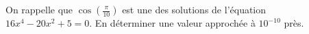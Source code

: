 \question{}  On rappelle que $\cos\left(\frac{\pi}{10}\right)$ est une des solutions de l'équation $16x^4-20x^2+5 = 0$. En déterminer une valeur approchée à $10^{-10}$ près.

